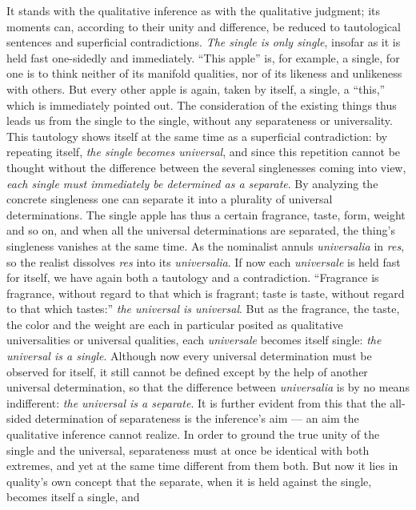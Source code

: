 \documentclass[12pt]{book}
\begin{document}
It stands with the qualitative inference as with the qualitative judgment;
its moments can, according to their unity and difference, be reduced to
tautological sentences and superficial contradictions. \emph{The single is
only single}, insofar as it is held fast one-sidedly and immediately.
``This apple'' is, for example, a single, for one is to think neither of its
manifold qualities, nor of its likeness and unlikeness with others. But
every other apple is again, taken by itself, a single, a ``this,'' which is
immediately pointed out. The consideration of the existing things thus leads
us from the single to the single, without any separateness or universality.
This tautology shows itself at the same time as a superficial contradiction:
by repeating itself, \emph{the single becomes universal}, and since this
repetition cannot be thought without the difference between the several
singlenesses coming into view, \emph{each single must immediately be
determined as a separate}. By analyzing the concrete singleness one can
separate it into a plurality of universal determinations. The single apple
has thus a certain fragrance, taste, form, weight and so on, and when all
the universal determinations are separated, the thing's singleness vanishes
at the same time. As the nominalist annuls \textit{universalia} in
\textit{res}, so the realist dissolves \textit{res} into its
\textit{universalia}. If now each \textit{universale} is held fast for
itself, we have again both a tautology and a contradiction. ``Fragrance is
fragrance, without regard to that which is fragrant; taste is taste, without
regard to that which tastes:'' \emph{the universal is universal}. But as the
fragrance, the taste, the color and the weight are each in particular
posited as qualitative universalities or universal qualities, each
\textit{universale} becomes itself single: \emph{the universal is a
single}. Although now every universal determination must be observed for
itself, it still cannot be defined except by the help of another universal
determination, so that the difference between \textit{universalia} is by no
means indifferent: \emph{the universal is a separate}. It is further evident
from this that the all-sided determination of separateness is the
inference's aim --- an aim the qualitative inference cannot realize. In
order to ground the true unity of the single and the universal, separateness
must at once be identical with both extremes, and yet at the same time
different from them both. But now it lies in quality's own concept that the
separate, when it is held against the single, becomes itself a single, and
\end{document}
